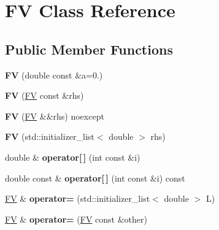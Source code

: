 \hypertarget{classFV}{\section{F\-V Class Reference}
\label{classFV}
}
\subsection*{Public Member Functions}
\begin{DoxyCompactItemize}
\item 
\hypertarget{classFV_a9b4fbb099348e0f5658290d99fcfde0f}{{\bfseries F\-V} (double const \&a=0.)}\label{classFV_a9b4fbb099348e0f5658290d99fcfde0f}

\item 
\hypertarget{classFV_a7806dbe1498cda6e7b5e9deb0772915d}{{\bfseries F\-V} (\hyperlink{classFV}{F\-V} const \&rhs)}\label{classFV_a7806dbe1498cda6e7b5e9deb0772915d}

\item 
\hypertarget{classFV_a64d4ea0c4b74dd2fd557c72c30987aa5}{{\bfseries F\-V} (\hyperlink{classFV}{F\-V} \&\&rhs) noexcept}\label{classFV_a64d4ea0c4b74dd2fd557c72c30987aa5}

\item 
\hypertarget{classFV_aae9c72a65282efeadacc1b2be82b8b29}{{\bfseries F\-V} (std\-::initializer\-\_\-list$<$ double $>$ rhs)}\label{classFV_aae9c72a65282efeadacc1b2be82b8b29}

\item 
\hypertarget{classFV_addb4bbcc8d3ba7d8e94c1b6fdd006acd}{double \& {\bfseries operator\mbox{[}$\,$\mbox{]}} (int const \&i)}\label{classFV_addb4bbcc8d3ba7d8e94c1b6fdd006acd}

\item 
\hypertarget{classFV_a8c340629f03c5f4d96aefd119dd43d6e}{double const \& {\bfseries operator\mbox{[}$\,$\mbox{]}} (int const \&i) const }\label{classFV_a8c340629f03c5f4d96aefd119dd43d6e}

\item 
\hypertarget{classFV_a3ce0839ccafbead03b532cdf4af5d4c1}{\hyperlink{classFV}{F\-V} \& {\bfseries operator=} (std\-::initializer\-\_\-list$<$ double $>$ L)}\label{classFV_a3ce0839ccafbead03b532cdf4af5d4c1}

\item 
\hypertarget{classFV_aa7bad77e8a25ff4d3d769a544eccf314}{\hyperlink{classFV}{F\-V} \& {\bfseries operator=} (\hyperlink{classFV}{F\-V} const \&other)}\label{classFV_aa7bad77e8a25ff4d3d769a544eccf314}


\end{DoxyCompactItemize}

